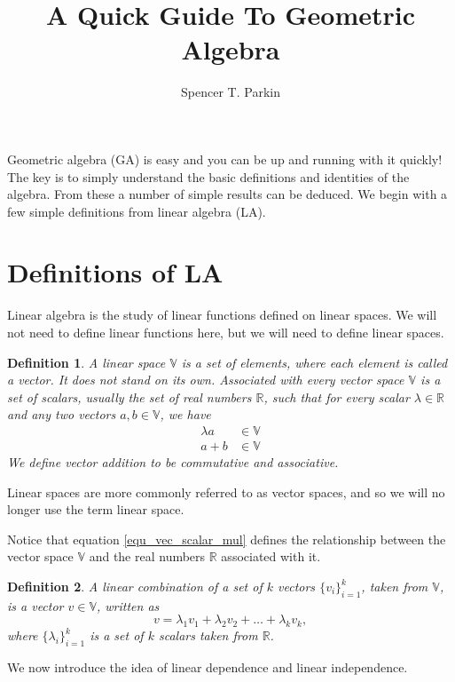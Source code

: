 \documentclass[12pt]{article}
\title{A Quick Guide To Geometric Algebra}
\author{Spencer T. Parkin}
\numberwithin{equation}{section}
\newcommand{\V}{\mathbb{V}}
\newcommand{\R}{\mathbb{R}}
\newtheorem{definition}{Definition}[section]
\begin{document}
\maketitle

Geometric algebra (GA) is easy and you can be up and running with it quickly!  The key is to
simply understand the basic definitions and identities of the algebra.  From these a number
of simple results can be deduced.  We begin with a few simple definitions from linear algebra (LA).

\section{Definitions of LA}

Linear algebra is the study of linear functions defined on linear spaces.  We will not need
to define linear functions here, but we will need to define linear spaces.
\begin{definition}\label{def_vec_space}
A linear space $\V$ is a set of elements, where each element is called a vector.  It does not stand on its own.
Associated with every vector space $\V$ is a set of scalars, usually the set of real numbers $\R$,
such that for every scalar $\lambda\in\R$ and any two vectors $a,b\in\V$, we have
\begin{align}
\lambda a &\in \V\label{equ_vec_scalar_mul} \\
a+b &\in\V\label{equ_vec_addition}
\end{align}
We define vector addition to be commutative and associative.
\end{definition}
Linear spaces are more commonly referred to as vector spaces, and so we will no longer
use the term linear space.

Notice that equation \eqref{equ_vec_scalar_mul} defines the relationship between the
vector space $\V$ and the real numbers $\R$ associated with it.

\begin{definition}
A linear combination of a set of $k$ vectors $\{v_i\}_{i=1}^k$, taken from $\V$, is
a vector $v\in\V$, written as
\begin{equation}
v = \lambda_1 v_1 + \lambda_2 v_2 + \dots + \lambda_k v_k,
\end{equation}
where $\{\lambda_i\}_{i=1}^k$ is a set of $k$ scalars taken from $\R$.
\end{definition}

We now introduce the idea of linear dependence and linear independence.
\end{document}
